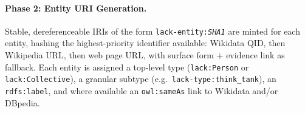 \vspace{-0.3cm}\begin{sloppypar}
\paragraph{Phase 2: Entity URI Generation.}
\label{sec:construction:entities}
Stable, dereferenceable IRIs of the form \texttt{lack-entity:\textit{SHA1}} are minted for each entity, hashing the highest-priority identifier available: Wikidata QID, then Wikipedia URL, then web page URL, with surface form + evidence link as fallback.
Each entity is assigned a top-level type (\texttt{lack:Person} or \texttt{lack:Collective}), a granular subtype (e.g.\ \texttt{lack-type:think\_tank}), an \texttt{rdfs:label}, and where available an \texttt{owl:sameAs} link to Wikidata and/or DBpedia.
\end{sloppypar}


